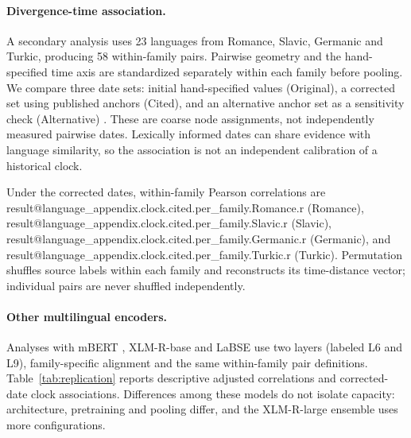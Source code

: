 \documentclass[mlmain]{jmlr}
\makeatletter
\newcommand{\Result}[1]{\csname result@#1\endcsname}
\makeatother
\begin{document}
\begin{table}[h]
\centering\small
\caption{Matched and unmatched controls. All $n$ values here count dependent pairs, not independent
languages. The reverse partial is geometry versus observed typology given genealogy. Source-deletion
ranges are descriptive.}
\end{table}

\paragraph{Divergence-time association.}
A secondary analysis uses 23 languages from Romance, Slavic, Germanic and Turkic, producing
58 within-family pairs. Pairwise geometry and the hand-specified time axis are standardized
separately within each family before pooling. We compare three date sets: initial hand-specified
values (Original), a corrected set using published anchors (Cited), and an alternative anchor set
as a sensitivity check (Alternative)
\citep{chang-etal-2015-ancestry,holman2011automated,savelyev-robbeets-2020-turkic}.
These are coarse node assignments, not independently measured pairwise dates. Lexically informed
dates can share evidence with language similarity, so the association is not an independent
calibration of a historical clock.

\begin{table}[h]
\centering\small
\caption{Date sensitivity with Pearson $r$, pooled Spearman $\rho$, and within-family source-label
permutation $p$ (two-sided, 2,000 draws). Removing Germanic is a reported sensitivity analysis,
not selection of a preferred population. Both geometry and dates are standardized within family.}
\end{table}

Under the corrected dates, within-family Pearson correlations are
\Result{language_appendix.clock.cited.per_family.Romance.r} (Romance),
\Result{language_appendix.clock.cited.per_family.Slavic.r} (Slavic),
\Result{language_appendix.clock.cited.per_family.Germanic.r} (Germanic), and
\Result{language_appendix.clock.cited.per_family.Turkic.r} (Turkic).
Permutation shuffles source labels within each family and reconstructs its time-distance vector;
individual pairs are never shuffled independently.

\paragraph{Other multilingual encoders.}
Analyses with mBERT \citep{devlin-etal-2019-bert}, XLM-R-base \citep{conneau-etal-2020-unsupervised}
and LaBSE \citep{feng-etal-2022-language} use two layers (labeled L6 and L9), family-specific
alignment and the same within-family pair definitions.
Table~\ref{tab:replication} reports descriptive adjusted correlations and corrected-date clock
associations. Differences among these models do not isolate capacity: architecture, pretraining
and pooling differ, and the XLM-R-large ensemble uses more configurations.
\end{document}
